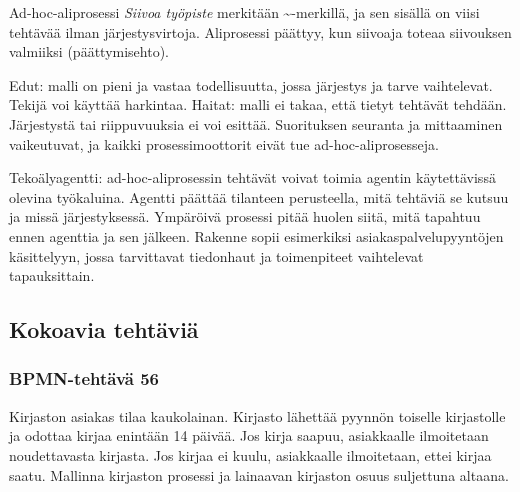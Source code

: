 \documentclass[
  finnish,
  letterpaper,
  DIV=11,
  numbers=noendperiod,
  oneside]{scrreprt}
\begin{document}
\begin{tcolorbox}[enhanced jigsaw, arc=.35mm, bottomrule=.15mm, bottomtitle=1mm, breakable, colback=white, colbacktitle=quarto-callout-tip-color!10!white, colframe=quarto-callout-tip-color-frame, coltitle=black, left=2mm, leftrule=.75mm, opacityback=0, opacitybacktitle=0.6, rightrule=.15mm, title=\textcolor{quarto-callout-tip-color}{\faLightbulb}\hspace{0.5em}{Malliratkaisu}, titlerule=0mm, toprule=.15mm, toptitle=1mm]

Ad-hoc-aliprosessi \emph{Siivoa työpiste} merkitään
\textasciitilde-merkillä, ja sen sisällä on viisi tehtävää ilman
järjestysvirtoja. Aliprosessi päättyy, kun siivoaja toteaa siivouksen
valmiiksi (päättymisehto).

Edut: malli on pieni ja vastaa todellisuutta, jossa järjestys ja tarve
vaihtelevat. Tekijä voi käyttää harkintaa. Haitat: malli ei takaa, että
tietyt tehtävät tehdään. Järjestystä tai riippuvuuksia ei voi esittää.
Suorituksen seuranta ja mittaaminen vaikeutuvat, ja kaikki
prosessimoottorit eivät tue ad-hoc-aliprosesseja.

Tekoälyagentti: ad-hoc-aliprosessin tehtävät voivat toimia agentin
käytettävissä olevina työkaluina. Agentti päättää tilanteen perusteella,
mitä tehtäviä se kutsuu ja missä järjestyksessä. Ympäröivä prosessi
pitää huolen siitä, mitä tapahtuu ennen agenttia ja sen jälkeen. Rakenne
sopii esimerkiksi asiakaspalvelupyyntöjen käsittelyyn, jossa tarvittavat
tiedonhaut ja toimenpiteet vaihtelevat tapauksittain.

\end{tcolorbox}

\subsection{Kokoavia tehtäviä}\label{kokoavia-tehtuxe4viuxe4}

\subsubsection{BPMN-tehtävä 56}\label{bpmn-tehtuxe4vuxe4-56}

Kirjaston asiakas tilaa kaukolainan. Kirjasto lähettää pyynnön toiselle
kirjastolle ja odottaa kirjaa enintään 14 päivää. Jos kirja saapuu,
asiakkaalle ilmoitetaan noudettavasta kirjasta. Jos kirjaa ei kuulu,
asiakkaalle ilmoitetaan, ettei kirjaa saatu. Mallinna kirjaston prosessi
ja lainaavan kirjaston osuus suljettuna altaana.
\end{document}
